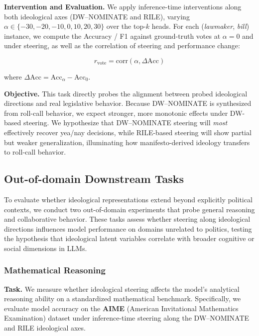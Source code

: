 \documentclass[11pt]{article}
\begin{document}
\textbf{Intervention and Evaluation.} We apply inference-time interventions along both ideological axes (DW--NOMINATE and RILE), varying $\alpha \in \{-30,-20,-10,0,10,20,30\}$ over the top-$k$ heads. For each (\emph{lawmaker}, \emph{bill}) instance, we compute the Accuracy / F1 against ground-truth votes at $\alpha=0$ and under steering, as well as the correlation of steering and performance change:

\[
    r_{\text{vote}} = \mathrm{corr}\!\left(\alpha, \Delta \text{Acc}\right)
\]

where $\Delta \text{Acc} = \text{Acc}_\alpha - \text{Acc}_0$.

\textbf{Objective.} This task directly probes the alignment between probed ideological directions and real legislative behavior. Because DW--NOMINATE is synthesized from roll-call behavior, we expect stronger, more monotonic effects under DW-based steering. We hypothesize that DW--NOMINATE steering will \emph{most} effectively recover yea/nay decisions, while RILE-based steering will show partial but weaker generalization, illuminating how manifesto-derived ideology transfers to roll-call behavior.

\subsection{Out-of-domain Downstream Tasks}

To evaluate whether ideological representations extend beyond explicitly political contexts, we conduct two out-of-domain experiments that probe general reasoning and collaborative behavior. These tasks assess whether steering along ideological directions influences model performance on domains unrelated to politics, testing the hypothesis that ideological latent variables correlate with broader cognitive or social dimensions in LLMs.

\subsubsection{Mathematical Reasoning}

\textbf{Task.} We measure whether ideological steering affects the model’s analytical reasoning ability on a standardized mathematical benchmark. Specifically, we evaluate model accuracy on the \textbf{AIME} (American Invitational Mathematics Examination) dataset under inference-time steering along the DW--NOMINATE and RILE ideological axes.
\end{document}
